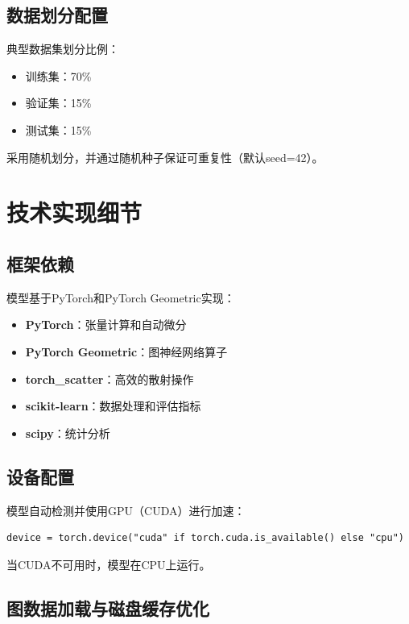 \subsection{数据划分配置}

典型数据集划分比例：
\begin{itemize}
    \item 训练集：70\%
    \item 验证集：15\%
    \item 测试集：15\%
\end{itemize}

采用随机划分，并通过随机种子保证可重复性（默认seed=42）。

\newpage

\section{技术实现细节}

\subsection{框架依赖}

模型基于PyTorch和PyTorch Geometric实现：

\begin{itemize}
    \item \textbf{PyTorch}：张量计算和自动微分
    \item \textbf{PyTorch Geometric}：图神经网络算子
    \item \textbf{torch\_scatter}：高效的散射操作
    \item \textbf{scikit-learn}：数据处理和评估指标
    \item \textbf{scipy}：统计分析
\end{itemize}

\subsection{设备配置}

模型自动检测并使用GPU（CUDA）进行加速：
\begin{verbatim}
device = torch.device("cuda" if torch.cuda.is_available() else "cpu")
\end{verbatim}

当CUDA不可用时，模型在CPU上运行。

\subsection{图数据加载与磁盘缓存优化}

